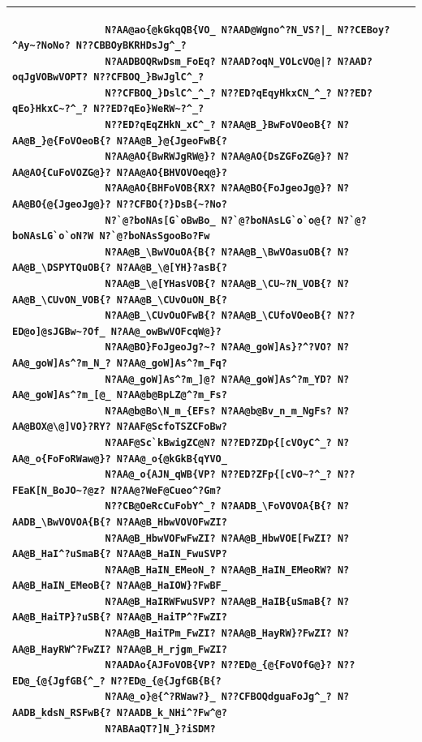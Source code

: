 \documentclass[11pt]{article}
\begin{document}
\begin{table}[h!]
\begin{center}
\begin{tabular}{|p{0.5cm} | p{14.5cm}|}
\begin{verbatim}
				N?AA@ao{@kGkqQB{VO_ N?AAD@Wgno^?N_VS?|_ N??CEBoy?^Ay~?NoNo? N??CBBOyBKRHDsJg^_?
				N?AADBOQRwDsm_FoEq? N?AAD?oqN_VOLcVO@|? N?AAD?oqJgVOBwVOPT? N??CFBOQ_}BwJglC^_?
				N??CFBOQ_}DslC^_^_? N??ED?qEqyHkxCN_^_? N??ED?qEo}HkxC~?^_? N??ED?qEo}WeRW~?^_?
				N??ED?qEqZHkN_xC^_? N?AA@B_}BwFoVOeoB{? N?AA@B_}@{FoVOeoB{? N?AA@B_}@{JgeoFwB{?
				N?AA@AO{BwRWJgRW@}? N?AA@AO{DsZGFoZG@}? N?AA@AO{CuFoVOZG@}? N?AA@AO{BHVOVOeq@}?
				N?AA@AO{BHFoVOB{RX? N?AA@BO{FoJgeoJg@}? N?AA@BO{@{JgeoJg@}? N??CFBO{?}DsB{~?No?
				N?`@?boNAs[G`oBwBo_ N?`@?boNAsLG`o`o@{? N?`@?boNAsLG`o`oN?W N?`@?boNAsSgooBo?Fw
				N?AA@B_\BwVOuOA{B{? N?AA@B_\BwVOasuOB{? N?AA@B_\DSPYTQuOB{? N?AA@B_\@[YH}?asB{?
				N?AA@B_\@[YHasVOB{? N?AA@B_\CU~?N_VOB{? N?AA@B_\CUvON_VOB{? N?AA@B_\CUvOuON_B{?
				N?AA@B_\CUvOuOFwB{? N?AA@B_\CUfoVOeoB{? N??ED@o]@sJGBw~?Of_ N?AA@_owBwVOFcqW@}?
				N?AA@BO}FoJgeoJg?~? N?AA@_goW]As}?^?VO? N?AA@_goW]As^?m_N_? N?AA@_goW]As^?m_Fq?
				N?AA@_goW]As^?m_]@? N?AA@_goW]As^?m_YD? N?AA@_goW]As^?m_[@_ N?AA@b@BpLZ@^?m_Fs?
				N?AA@b@Bo\N_m_{EFs? N?AA@b@Bv_n_m_NgFs? N?AA@BOX@\@]VO}?RY? N?AAF@ScfoTSZCFoBw?
				N?AAF@Sc`kBwigZC@N? N??ED?ZDp{[cVOyC^_? N?AA@_o{FoFoRWaw@}? N?AA@_o{@kGkB{qYVO_
				N?AA@_o{AJN_qWB{VP? N??ED?ZFp{[cVO~?^_? N??FEaK[N_BoJO~?@z? N?AA@?WeF@Cueo^?Gm?
				N??CB@OeRcCuFobY^_? N?AADB_\FoVOVOA{B{? N?AADB_\BwVOVOA{B{? N?AA@B_HbwVOVOFwZI?
				N?AA@B_HbwVOFwFwZI? N?AA@B_HbwVOE[FwZI? N?AA@B_HaI^?uSmaB{? N?AA@B_HaIN_FwuSVP?
				N?AA@B_HaIN_EMeoN_? N?AA@B_HaIN_EMeoRW? N?AA@B_HaIN_EMeoB{? N?AA@B_HaIOW}?FwBF_
				N?AA@B_HaIRWFwuSVP? N?AA@B_HaIB{uSmaB{? N?AA@B_HaiTP}?uSB{? N?AA@B_HaiTP^?FwZI?
				N?AA@B_HaiTPm_FwZI? N?AA@B_HayRW}?FwZI? N?AA@B_HayRW^?FwZI? N?AA@B_H_rjgm_FwZI?
				N?AADAo{AJFoVOB{VP? N??ED@_{@{FoVOfG@}? N??ED@_{@{JgfGB{^_? N??ED@_{@{JgfGB{B{?
				N?AA@_o}@{^?RWaw?}_ N??CFBOQdguaFoJg^_? N?AADB_kdsN_RSFwB{? N?AADB_k_NHi^?Fw^@?
				N?ABAaQT?]N_}?iSDM?
				\end{verbatim} \\ 
				\hline
			\end{tabular}
		\end{center}
	\end{table}
\end{document}
